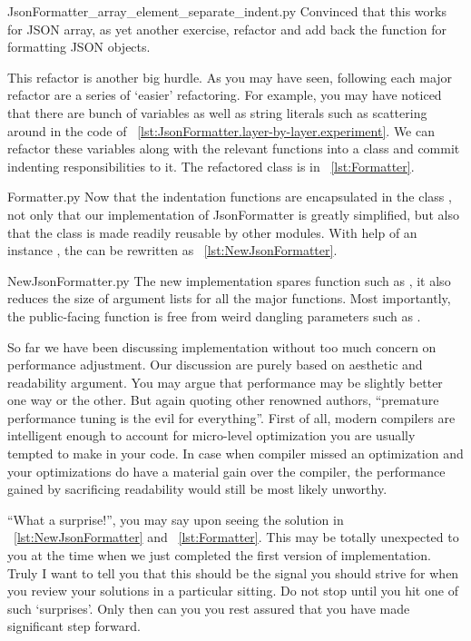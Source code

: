 
{JsonFormatter_array_element_separate_indent.py}
Convinced that this works for JSON array, as yet another exercise, refactor and add back the
function for formatting JSON objects.

This refactor is another big hurdle.
As you may have seen, following each major refactor are a series of `easier' refactoring.
For example, you may have noticed that there are bunch of variables  as
well as string literals such as  scattering around in the code of
~\autoref{lst:JsonFormatter.layer-by-layer.experiment}.
We can refactor these variables along with the relevant functions into a class
 and commit indenting responsibilities to it.
The refactored class is in ~\autoref{lst:Formatter}.

{Formatter.py}
Now that the indentation functions are encapsulated
in the class , not only that our implementation of JsonFormatter is greatly
simplified, but also that the class is made readily reusable by other modules.
With help of an instance , the  can be rewritten as
~\autoref{lst:NewJsonFormatter}.

{NewJsonFormatter.py}
The new implementation spares function such as , it also reduces the
size of argument lists for all the major functions.
Most importantly, the public-facing function is free from weird dangling parameters such as
.

So far we have been discussing implementation without too much concern on performance adjustment.
Our discussion are purely based on aesthetic and readability argument.
You may argue that performance may be slightly better one way or the other.
But again quoting other renowned authors, ``premature performance tuning is the evil for
everything''.
First of all, modern compilers are intelligent enough to account for micro-level optimization
you are usually tempted to make in your code.
In case when compiler missed an optimization and
your optimizations do have a material gain over the compiler,
the performance gained by sacrificing readability would still be most likely unworthy.

``What a surprise!'', you may say upon seeing the solution in ~\autoref{lst:NewJsonFormatter} and
~\autoref{lst:Formatter}.
This may be totally unexpected to you at the time when we just completed the first version of
implementation.
Truly I want to tell you that this should be the signal you should strive for when you review your
solutions in a particular sitting.
Do not stop until you hit one of such `surprises'.
Only then can you you rest assured that you have made significant step forward.
